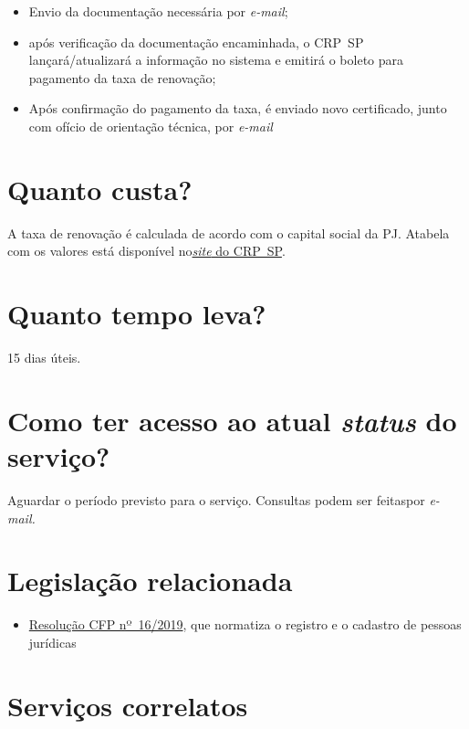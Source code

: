 \begin{itemize}
  \item  Envio da documentação necessária por \emph{e-mail};
  \item  após verificação da documentação encaminhada, o CRP~SP  lançará/atualizará a informação no sistema e emitirá o boleto para  pagamento da taxa de renovação;
  \item  Após confirmação do pagamento da taxa, é enviado novo certificado,  junto com ofício de orientação técnica, por \emph{e-mail}
\end{itemize}

\section{Quanto custa?}

A taxa de renovação é calculada de acordo com o capital social da PJ. Atabela com os valores está disponível no\href{https://www.crpsp.org/pagina/view/207}{\emph{site} do CRP~SP}.

\section{Quanto tempo leva?}

15 dias úteis.

\section{Como ter acesso ao atual \emph{status} do serviço?}

Aguardar o período previsto para o serviço. Consultas podem ser feitaspor \emph{e-mail.}

\section{Legislação relacionada}

\begin{itemize}
  \item  \href{https://atosoficiais.com.br/cfp/resolucao-administrativa-financeira-n-16-2019-altera-o-manual-de-procedimentos-administrativo-e-financeiro-do-sistema-conselhos-de-psicologia-anexo-da-resolucao-cfp-n-202018-a-resolucao-cfp-n-03-2007-a-resolucao-cfp-n-16-2019-e-da-outras-providencias}{Resolução  CFP nº~16/2019}, que normatiza o registro e o cadastro de pessoas  jurídicas
\end{itemize}

\section{Serviços correlatos}

